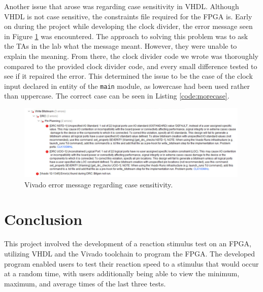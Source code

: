 \documentclass[11pt]{article}
\begin{document}
Another issue that arose was regarding case sensitivity in VHDL. Although VHDL is not case sensitive, the constraints file required for the FPGA is. Early on during the project while developing the clock divider, the error message seen in Figure \ref{fig:error} was encountered. The approach to solving this problem was to ask the TAs in the lab what the message meant. However, they were unable to explain the meaning. From there, the clock divider code we wrote was thoroughly compared to the provided clock divider code, and every small difference tested to see if it repaired the error. This determined the issue to be the case of the clock input declared in entity of the \texttt{main} module, as lowercase had been used rather than uppercase. The correct case can be seen in Listing \ref{code:morecase}.

\begin{figure}[H]
	\centering
	\includegraphics[width=0.99\textwidth]{error.png}
	\caption{Vivado error message regarding case sensitivity.}
	\label{fig:error}
\end{figure}

\section{Conclusion}


This project involved the development of a reaction stimulus test on an FPGA, utilizing VHDL and the Vivado toolchain to program the FPGA. The developed program enabled users to test their reaction speed to a stimulus that would occur at a random time, with users additionally being able to view the minimum, maximum, and average times of the last three tests.
\end{document}
